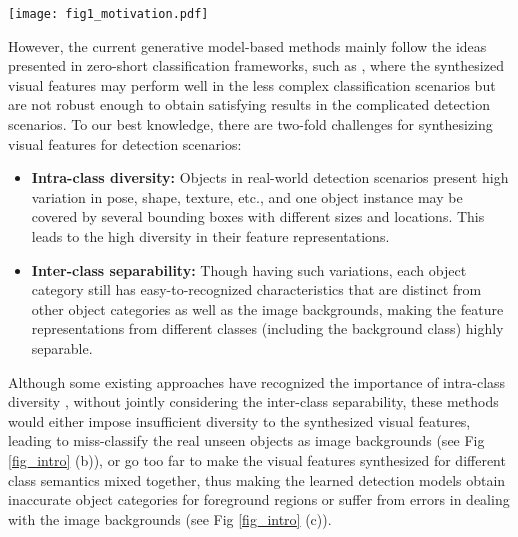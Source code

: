 \documentclass[10pt,twocolumn,letterpaper]{article}
\begin{document}
\begin{figure*}[t]
	\begin{center}
		\texttt{[image: fig1\_motivation.pdf]}
	\end{center}
		\vspace{-3mm}
	\caption{Illustrations of the problem studied in this work. In real cases, the feature space built by the samples show high intra-class diversity but still with inter-class separability like in (a), whereas the spaces of the synthesized visual features learned by existing approaches either have insufficient intra-class diversity, as shown in (b), or have excess intra-class diversity to make inter-class inseparable, as shown in (c).}
	\label{fig_intro}
	\vspace{-3mm}
\end{figure*}

However, the current generative model-based methods mainly follow the ideas presented in zero-short classification frameworks, such as \cite{wu2020self,pambala2020generative}, where the synthesized visual features may perform well in the less complex classification scenarios but are not robust enough to obtain satisfying results in the complicated detection scenarios. To our best knowledge, there are two-fold challenges for synthesizing visual features for detection scenarios:
	\begin{itemize}
		\item \textbf{Intra-class diversity:} Objects in real-world detection scenarios present high variation in pose, shape, texture, etc., and one object instance may be covered by several bounding boxes with different sizes and locations. This leads to the high diversity in their feature representations.
		\item \textbf{Inter-class separability:} Though having such variations, each object category still has easy-to-recognized characteristics that are distinct from other object categories as well as the image backgrounds, making the feature representations from different classes (including the background class) highly separable.
	\end{itemize}
Although some existing approaches have recognized the importance of intra-class diversity \cite{zhao2020gtnet,hayat2020synthesizing}, without jointly considering the inter-class separability, these methods would either impose insufficient diversity to the synthesized visual features, leading to miss-classify the real unseen objects as image backgrounds (see Fig \ref{fig_intro} (b)), or go too far to make the visual features synthesized for different class semantics mixed together, thus making the learned detection models obtain inaccurate object categories for foreground regions or suffer from errors in dealing with the image backgrounds (see Fig \ref{fig_intro} (c)).
\end{document}
